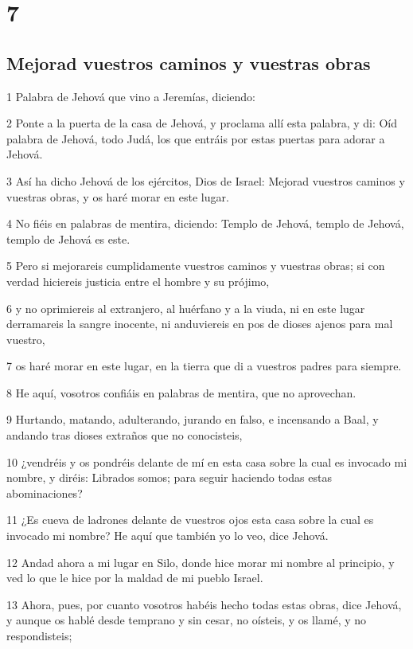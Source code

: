 \chapter{7}

\section*{Mejorad vuestros caminos y vuestras obras}

\par 1 Palabra de Jehová que vino a Jeremías, diciendo:
\par 2 Ponte a la puerta de la casa de Jehová, y proclama allí esta palabra, y di: Oíd palabra de Jehová, todo Judá, los que entráis por estas puertas para adorar a Jehová.
\par 3 Así ha dicho Jehová de los ejércitos, Dios de Israel: Mejorad vuestros caminos y vuestras obras, y os haré morar en este lugar.
\par 4 No fiéis en palabras de mentira, diciendo: Templo de Jehová, templo de Jehová, templo de Jehová es este.
\par 5 Pero si mejorareis cumplidamente vuestros caminos y vuestras obras; si con verdad hiciereis justicia entre el hombre y su prójimo,
\par 6 y no oprimiereis al extranjero, al huérfano y a la viuda, ni en este lugar derramareis la sangre inocente, ni anduviereis en pos de dioses ajenos para mal vuestro,
\par 7 os haré morar en este lugar, en la tierra que di a vuestros padres para siempre. 
\par 8 He aquí, vosotros confiáis en palabras de mentira, que no aprovechan.
\par 9 Hurtando, matando, adulterando, jurando en falso, e incensando a Baal, y andando tras dioses extraños que no conocisteis,
\par 10 ¿vendréis y os pondréis delante de mí en esta casa sobre la cual es invocado mi nombre, y diréis: Librados somos; para seguir haciendo todas estas abominaciones?
\par 11 ¿Es cueva de ladrones delante de vuestros ojos esta casa sobre la cual es invocado mi nombre? He aquí que también yo lo veo, dice Jehová.
\par 12 Andad ahora a mi lugar en Silo, donde hice morar mi nombre al principio, y ved lo que le hice por la maldad de mi pueblo Israel.
\par 13 Ahora, pues, por cuanto vosotros habéis hecho todas estas obras, dice Jehová, y aunque os hablé desde temprano y sin cesar, no oísteis, y os llamé, y no respondisteis;
